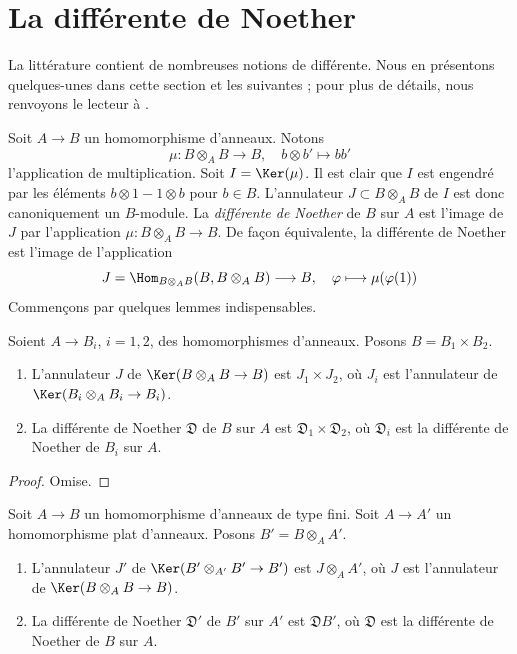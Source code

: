 \section{La différente de Noether}
\label{section-noether-different}

\noindent
La littérature contient de nombreuses notions de différente.
Nous en présentons quelques-unes dans cette section et les suivantes ; pour plus
de détails, nous renvoyons le lecteur à \cite{Kunz}.

\medskip\noindent
Soit $A \to B$ un homomorphisme d'anneaux. Notons
$$
\mu : B \otimes_A B \longrightarrow B,\quad
b \otimes b' \longmapsto bb'
$$
l'application de multiplication. Soit $I = \Ker(\mu)$. Il est clair que $I$ est
engendré par les éléments $b \otimes 1 - 1 \otimes b$ pour $b \in B$.
L'annulateur $J \subset B \otimes_A B$ de $I$ est donc canoniquement un $B$-module.
La {\it différente de Noether} de $B$ sur $A$ est
l'image de $J$ par l'application $\mu : B \otimes_A B \to B$. De façon équivalente,
la différente de Noether est l'image de l'application
$$
J = \Hom_{B \otimes_A B}(B, B \otimes_A B) \longrightarrow B,\quad
\varphi \longmapsto \mu(\varphi(1))
$$
Commençons par quelques lemmes indispensables.

\begin{lemma}
\label{lemma-noether-different-product}
Soient $A \to B_i$, $i = 1, 2$, des homomorphismes d'anneaux. Posons $B = B_1 \times B_2$.
\begin{enumerate}
\item L'annulateur $J$ de $\Ker(B \otimes_A B \to B)$ est $J_1 \times J_2$,
où $J_i$ est l'annulateur de $\Ker(B_i \otimes_A B_i \to B_i)$.
\item La différente de Noether $\mathfrak{D}$ de $B$ sur $A$ est
$\mathfrak{D}_1 \times \mathfrak{D}_2$, où $\mathfrak{D}_i$ est
la différente de Noether de $B_i$ sur $A$.
\end{enumerate}
\end{lemma}

\begin{proof}
Omise.
\end{proof}

\begin{lemma}
\label{lemma-noether-different-base-change}
Soit $A \to B$ un homomorphisme d'anneaux de type fini. Soit $A \to A'$ un homomorphisme plat d'anneaux.
Posons $B' = B \otimes_A A'$.
\begin{enumerate}
\item L'annulateur $J'$ de $\Ker(B' \otimes_{A'} B' \to B')$ est
$J \otimes_A A'$, où $J$ est l'annulateur de $\Ker(B \otimes_A B \to B)$.
\item La différente de Noether $\mathfrak{D}'$ de $B'$ sur $A'$ est
$\mathfrak{D}B'$, où $\mathfrak{D}$ est
la différente de Noether de $B$ sur $A$.
\end{enumerate}
\end{lemma}


